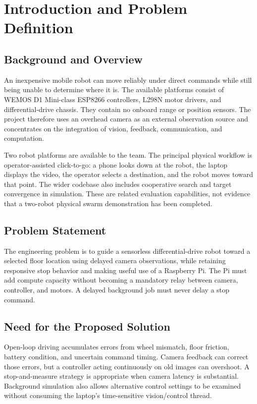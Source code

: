 \documentclass[11pt,a4paper]{article}
\begin{document}
\clearpage\begingroup\small\setlength{\parskip}{0pt}\tableofcontents\endgroup\clearpage{}

\section{Introduction and Problem Definition}
\subsection{Background and Overview}
An inexpensive mobile robot can move reliably under direct commands while still
being unable to determine where it is. The available platforms consist of WEMOS
D1 Mini-class ESP8266 controllers, L298N motor drivers, and differential-drive
chassis. They contain no onboard range or position sensors. The project therefore
uses an overhead camera as an external observation source and concentrates on the
integration of vision, feedback, communication, and computation.

Two robot platforms are available to the team. The principal physical workflow is
operator-assisted click-to-go: a phone looks down at the robot, the laptop displays
the video, the operator selects a destination, and the robot moves toward that
point. The wider codebase also includes cooperative search and target convergence
in simulation. These are related evaluation capabilities, not evidence that a
two-robot physical swarm demonstration has been completed.

\subsection{Problem Statement}
The engineering problem is to guide a sensorless differential-drive robot toward
a selected floor location using delayed camera observations, while retaining
responsive stop behavior and making useful use of a Raspberry Pi. The Pi must add
compute capacity without becoming a mandatory relay between camera, controller,
and motors. A delayed background job must never delay a stop command.

\subsection{Need for the Proposed Solution}
Open-loop driving accumulates errors from wheel mismatch, floor friction, battery
condition, and uncertain command timing. Camera feedback can correct those errors,
but a controller acting continuously on old images can overshoot. A stop-and-measure
strategy is appropriate when camera latency is substantial. Background simulation
also allows alternative control settings to be examined without consuming the
laptop's time-sensitive vision/control thread.
\end{document}

